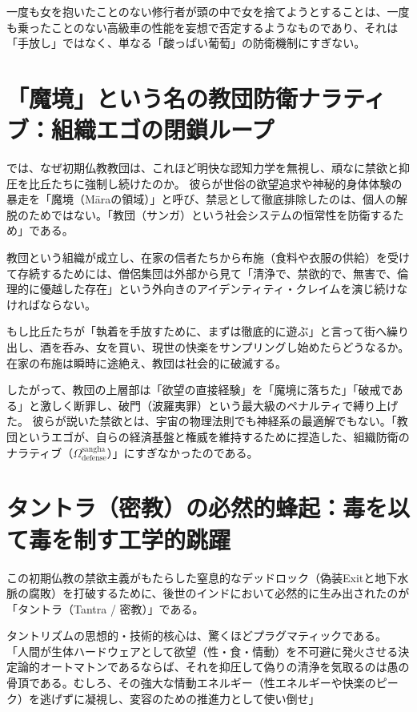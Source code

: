 一度も女を抱いたことのない修行者が頭の中で女を捨てようとすることは、一度も乗ったことのない高級車の性能を妄想で否定するようなものであり、それは「手放し」ではなく、単なる「酸っぱい葡萄」の防衛機制にすぎない。

\section{「魔境」という名の教団防衛ナラティブ：組織エゴの閉鎖ループ}

では、なぜ初期仏教教団は、これほど明快な認知力学を無視し、頑なに禁欲と抑圧を比丘たちに強制し続けたのか。
彼らが世俗の欲望追求や神秘的身体体験の暴走を「魔境（Māraの領域）」と呼び、禁忌として徹底排除したのは、個人の解脱のためではない。「教団（サンガ）という社会システムの恒常性を防衛するため」である。

教団という組織が成立し、在家の信者たちから布施（食料や衣服の供給）を受けて存続するためには、僧侶集団は外部から見て「清浄で、禁欲的で、無害で、倫理的に優越した存在」という外向きのアイデンティティ・クレイムを演じ続けなければならない。

もし比丘たちが「執着を手放すために、まずは徹底的に遊ぶ」と言って街へ繰り出し、酒を呑み、女を買い、現世の快楽をサンプリングし始めたらどうなるか。在家の布施は瞬時に途絶え、教団は社会的に破滅する。

したがって、教団の上層部は「欲望の直接経験」を「魔境に落ちた」「破戒である」と激しく断罪し、破門（波羅夷罪）という最大級のペナルティで縛り上げた。
彼らが説いた禁欲とは、宇宙の物理法則でも神経系の最適解でもない。「教団というエゴが、自らの経済基盤と権威を維持するために捏造した、組織防衛のナラティブ（$\Omega^{\mathrm{sangha}}_{\mathrm{defense}}$）」にすぎなかったのである。

\section{タントラ（密教）の必然的蜂起：毒を以て毒を制す工学的跳躍}

この初期仏教の禁欲主義がもたらした窒息的なデッドロック（偽装Exitと地下水脈の腐敗）を打破するために、後世のインドにおいて必然的に生み出されたのが「タントラ（Tantra / 密教）」である。

タントリズムの思想的・技術的核心は、驚くほどプラグマティックである。
「人間が生体ハードウェアとして欲望（性・食・情動）を不可避に発火させる決定論的オートマトンであるならば、それを抑圧して偽りの清浄を気取るのは愚の骨頂である。むしろ、その強大な情動エネルギー（性エネルギーや快楽のピーク）を逃げずに凝視し、変容のための推進力として使い倒せ」

